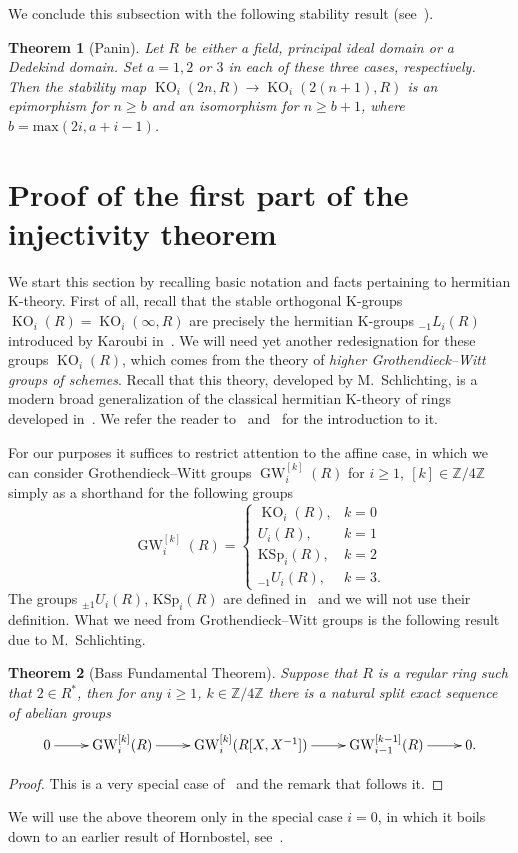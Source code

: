 \documentclass[oneside, 8pt]{amsart}
\newtheorem*{theorem*}{Theorem}
\theoremstyle{remark}
\theoremstyle{definition}
\numberwithin{lemma}{section}
\numberwithin{prop}{section}
\numberwithin{corollary}{section}
\DeclareMathOperator{\KO}{KO}
\DeclareMathOperator{\GW}{GW}
\newcommand{\ZZ}{\mathbb{Z}}
\numberwithin{equation}{section}
\begin{document}
We conclude this subsection with the following stability result (see~\cite[Theorem~9.4]{Pa89}).
\begin{theorem*}[Panin] \label{lem:Panin-stability}
 Let $R$ be either a field, principal ideal domain or a Dedekind domain. Set $a = 1,2$ or $3$ in each of these three cases, respectively.
 Then the stability map $\KO_i(2n, R) \to \KO_i(2(n+1), R)$ is an epimorphism for $n \geq b$ 
 and an isomorphism for $n \geq b + 1$, where $b = \mathrm{max}(2i, a+i-1)$. \end{theorem*}

\section{Proof of the first part of the injectivity theorem} \label{firstPart}
We start this section by recalling basic notation and facts pertaining to hermitian K-theory.
First of all, recall that the stable orthogonal K-groups $\KO_i(R) = \KO_i(\infty, R)$ are precisely the hermitian K-groups ${}_{-1}\!L_i(R)$ introduced by Karoubi in~\cite{Ka80}. We will need yet another redesignation for these groups $\KO_i(R)$, which comes from the theory of {\it higher Grothendieck--Witt groups of schemes}.
Recall that this theory, developed by M.~Schlichting, is a modern broad generalization of the classical hermitian K-theory of rings developed in~\cite{Ka80}.
We refer the reader to~\cite[\S~2]{FRS12} and~\cite[\S~2]{AF17} for the introduction to it.

For our purposes it suffices to restrict attention to the affine case, in which we can consider Grothendieck--Witt groups $\GW_i^{[k]}(R)$ for $i \geq 1,\ [k] \in \ZZ/4\ZZ$
 simply as a shorthand for the following groups
\begin{equation*} \GW_i^{[k]}(R) = \left\{\begin{array}{ll} \KO_i(R), & k = 0 \\ U_i(R), & k = 1 \\ \mathrm{KSp}_i(R), & k = 2 \\ {}_{-1}\!U_i(R), & k = 3. \end{array}\right. \end{equation*}
The groups ${}_{\pm 1}\!U_i(R)$, $\mathrm{KSp}_i(R)$ are defined in~\cite{Ka80} and we will not use their definition. 
What we need from Grothendieck--Witt groups is the following result due to M.~Schlichting.
\begin{theorem*}[Bass Fundamental Theorem]\label{bass-ft} Suppose that $R$ is a regular ring such that $2 \in R^*$, 
then for any $i\geq 1$, $k\in \ZZ/4\ZZ$ there is a natural split exact sequence of abelian groups \[ \xymatrix{ 0 \ar[r] & \GW_i^{[k]}(R) \ar[r] & \GW_i^{[k]}(R[X, X^{-1}]) \ar[r]  & \GW_{i-1}^{[k-1]}(R) \ar[r] & 0.} \] \end{theorem*}
\begin{proof} This is a very special case of~\cite[Theorem~9.13]{Sch16} and the remark that follows it. \end{proof}
We will use the above theorem only in the special case $i=0$, in which it boils down to an earlier result of Hornbostel, see~\cite[Corollary~5.3]{Ho05}.
\end{document}
